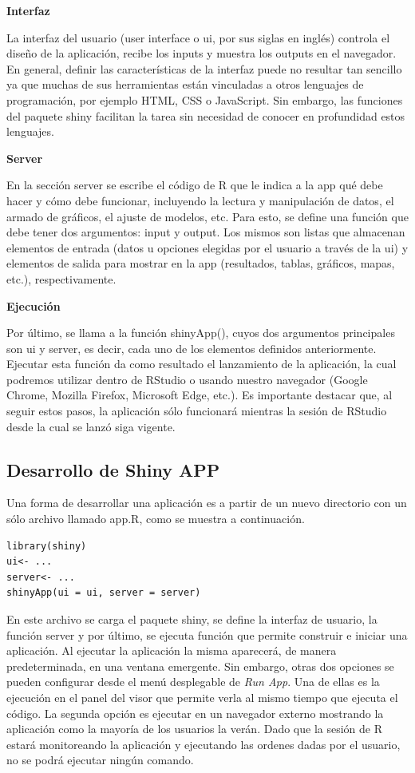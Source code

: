 \textbf{Interfaz}

La interfaz del usuario (user interface o ui, por sus siglas en inglés) controla el diseño de la aplicación, recibe los inputs y muestra los outputs en el navegador. En general, definir las características de la interfaz puede no resultar tan sencillo ya que muchas de sus herramientas están vinculadas a otros lenguajes de programación, por ejemplo HTML, CSS o JavaScript. Sin embargo, las funciones del paquete shiny facilitan la tarea sin necesidad de conocer en profundidad estos lenguajes.

\textbf{Server}

En la sección server se escribe el código de R que le indica a la app qué debe hacer y cómo debe funcionar, incluyendo la lectura y manipulación de datos, el armado de gráficos, el ajuste de modelos, etc. Para esto, se define una función que debe tener dos argumentos: input y output. Los mismos son listas que almacenan elementos de entrada (datos u opciones elegidas por el usuario a través de la ui) y elementos de salida para mostrar en la app (resultados, tablas, gráficos, mapas, etc.), respectivamente.


\textbf{Ejecución}

Por último, se llama a la función shinyApp(), cuyos dos argumentos principales son ui y server, es decir, cada uno de los elementos definidos anteriormente. Ejecutar esta función da como resultado el lanzamiento de la aplicación, la cual podremos utilizar dentro de RStudio o usando nuestro navegador (Google Chrome, Mozilla Firefox, Microsoft Edge, etc.). Es importante destacar que, al seguir estos pasos, la aplicación sólo funcionará mientras la sesión de RStudio desde la cual se lanzó siga vigente.


\subsection{Desarrollo de Shiny APP}

Una forma de desarrollar una  aplicación es a partir de un nuevo directorio con un sólo archivo llamado app.R, como se muestra a continuación. 

\begin{lstlisting}
library(shiny)
ui<- ...
server<- ...
shinyApp(ui = ui, server = server)
\end{lstlisting}

En este archivo se carga el paquete shiny, se define la interfaz de usuario, la función server y por último, se ejecuta función que permite construir e iniciar una aplicación. Al ejecutar la aplicación la misma aparecerá, de manera predeterminada, en una ventana emergente. Sin embargo, otras dos opciones se pueden configurar desde el menú desplegable de \emph{Run App}. Una de ellas es la ejecución en el panel del visor que permite verla al mismo tiempo que ejecuta el código. La segunda opción es ejecutar en un navegador externo mostrando la aplicación como la mayoría de los usuarios la verán. Dado que la sesión de R estará monitoreando la aplicación y ejecutando las ordenes dadas por el usuario, no se podrá ejecutar ningún comando.


